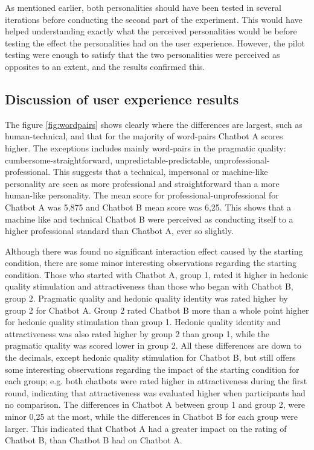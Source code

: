 As mentioned earlier, both personalities should have been tested in several iterations before conducting the second part of the experiment. This would have helped understanding exactly what the perceived personalities would be before testing the effect the personalities had on the user experience. However, the pilot testing were enough to satisfy that the two personalities were perceived as opposites to an extent, and the results confirmed this.


\subsection{Discussion of user experience results}

The figure \ref{fig:wordpairs} shows clearly where the differences are largest, such as human-technical, and that for the majority of word-pairs Chatbot A scores higher. The exceptions includes mainly word-pairs in the pragmatic quality: cumbersome-straightforward, unpredictable-predictable, unprofessional-professional. This suggests that a technical, impersonal or machine-like personality are seen as more professional and straightforward than a more human-like personality. The mean score for professional-unprofessional for Chatbot A was 5,875 and Chatbot B mean score was 6,25. This shows that a machine like and technical Chatbot B were perceived as conducting itself to a higher professional standard than Chatbot A, ever so slightly.

Although there was found no significant interaction effect caused by the starting condition, there are some minor interesting observations regarding the starting condition. Those who started with Chatbot A, group 1, rated it higher in hedonic quality stimulation and attractiveness than those who began with Chatbot B, group 2. Pragmatic quality and hedonic quality identity was rated higher by group 2 for Chatbot A. Group 2 rated Chatbot B more than a whole point higher for hedonic quality stimulation than group 1. Hedonic quality identity and attractiveness was also rated higher by group 2 than group 1, while the pragmatic quality was scored lower in group 2. All these differences are down to the decimals, except hedonic  quality stimulation for Chatbot B, but still offers some interesting observations regarding the impact of the starting condition for each group; e.g. both chatbots were rated higher in attractiveness during the first round, indicating that attractiveness was evaluated higher when participants had no comparison. The differences in Chatbot A between group 1 and group 2, were minor 0,25 at the most, while the differences in Chatbot B for each group were larger. This indicated that Chatbot A had a greater impact on the rating of Chatbot B, than Chatbot B had on Chatbot A.

